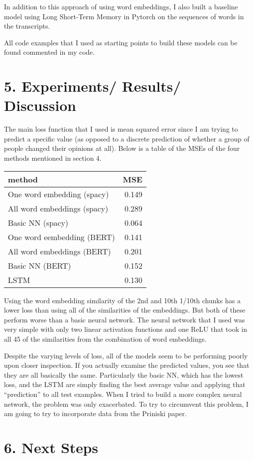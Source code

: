 \documentclass[12pt,]{article}
\begin{document}
In addition to this approach of using word embeddings, I also built a
baseline model using Long Short-Term Memory in Pytorch on the sequences
of words in the transcripts.

All code examples that I used as starting points to build these models
can be found commented in my code.

\hypertarget{experiments-results-discussion}{%
\section{5. Experiments/ Results/
Discussion}\label{experiments-results-discussion}}

The main loss function that I used is mean squared error since I am
trying to predict a specific value (as opposed to a discrete prediction
of whether a group of people changed their opinions at all). Below is a
table of the MSEs of the four methods mentioned in section 4.

\begin{longtable}[]{@{}lr@{}}
\toprule
method & MSE\tabularnewline
\midrule
\endhead
One word embedding (spacy) & 0.149\tabularnewline
All word embeddings (spacy) & 0.289\tabularnewline
Basic NN (spacy) & 0.064\tabularnewline
One word eembedding (BERT) & 0.141\tabularnewline
All word embeddings (BERT) & 0.201\tabularnewline
Basic NN (BERT) & 0.152\tabularnewline
LSTM & 0.130\tabularnewline
\bottomrule
\end{longtable}

Using the word embedding similarity of the 2nd and 10th 1/10th chunks
has a lower loss than using all of the similarities of the embeddings.
But both of these perform worse than a basic neural network. The neural
network that I used was very simple with only two linear activation
functions and one ReLU that took in all 45 of the similarities from the
combination of word embeddings.

Despite the varying levels of loss, all of the models seem to be
performing poorly upon closer inspection. If you actually examine the
predicted values, you see that they are all basically the same.
Particularly the basic NN, which has the lowest loss, and the LSTM are
simply finding the best average value and applying that ``prediction''
to all test examples. When I tried to build a more complex neural
network, the problem was only exacerbated. To try to circumvent this
problem, I am going to try to incorporate data from the Priniski paper.

\hypertarget{next-steps}{%
\section{6. Next Steps}\label{next-steps}}
\end{document}
